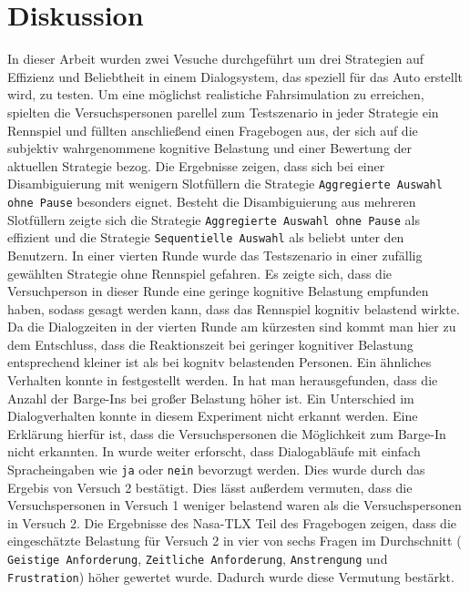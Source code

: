 \documentclass[12pt,a4paper]{scrartcl}
\begin{document}
\section{Diskussion}
\label{discussion}
In dieser Arbeit wurden zwei Vesuche durchgeführt um drei Strategien auf Effizienz und Beliebtheit in einem Dialogsystem, das speziell für das Auto erstellt wird, zu testen. Um eine möglichst realistiche Fahrsimulation zu erreichen, spielten die Versuchspersonen parellel zum Testszenario in jeder Strategie ein Rennspiel und füllten anschließend einen Fragebogen aus, der sich auf die subjektiv wahrgenommene kognitive Belastung und einer Bewertung der aktuellen Strategie bezog.
Die Ergebnisse zeigen, dass sich bei einer Disambiguierung mit wenigern Slotfüllern die Strategie \texttt{Aggregierte Auswahl ohne Pause} besonders eignet. Besteht die Disambiguierung aus mehreren Slotfüllern zeigte sich die Strategie \texttt{Aggregierte Auswahl ohne Pause} als effizient und die Strategie \texttt{Sequentielle Auswahl} als beliebt unter den Benutzern. \newline \newline
In einer vierten Runde wurde das Testszenario in einer zufällig gewählten Strategie ohne Rennspiel gefahren. Es zeigte sich, dass die Versuchperson in dieser Runde eine geringe kognitive Belastung empfunden haben, sodass gesagt werden kann, dass das Rennspiel kognitiv belastend wirkte. Da die Dialogzeiten in der vierten Runde am kürzesten sind kommt man hier zu dem Entschluss, dass die Reaktionszeit bei geringer kognitiver Belastung entsprechend kleiner ist als bei kognitv belastenden Personen. Ein ähnliches Verhalten konnte in \cite{DbCL} festgestellt werden. In \cite{eCLDS} hat man herausgefunden, dass die Anzahl der Barge-Ins bei großer Belastung höher ist. Ein Unterschied im Dialogverhalten konnte in diesem Experiment nicht erkannt werden. Eine Erklärung hierfür ist, dass die Versuchspersonen die Möglichkeit zum Barge-In nicht erkannten. In \cite{eCLDS} wurde weiter erforscht, dass Dialogabläufe mit einfach Spracheingaben wie \texttt{ja} oder \texttt{nein} bevorzugt werden. Dies wurde durch das Ergebis von Versuch 2 bestätigt. Dies lässt außerdem vermuten, dass die Versuchspersonen in Versuch 1 weniger belastend waren als die Versuchspersonen in Versuch 2. Die Ergebnisse des Nasa-TLX Teil des Fragebogen zeigen, dass die eingeschätzte Belastung für Versuch 2 in vier von sechs Fragen im Durchschnitt ( \texttt{Geistige Anforderung}, \texttt{Zeitliche Anforderung}, \texttt{Anstrengung} und \texttt{Frustration}) höher gewertet wurde. Dadurch wurde diese Vermutung bestärkt. \newline \newline
\end{document}
